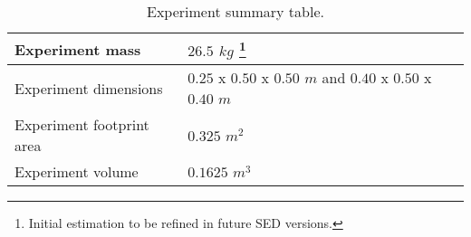 \begin{table}[!ht]
\centering
\begin{tabular}{|l|l|}
\hline
 Experiment mass  & $26.5$ $kg$ \footnote[13]{Initial estimation to be refined in future SED versions.} \\ \hline
 Experiment dimensions & $0.25$ x $0.50$ x $0.50$ $m$ and $0.40$ x $0.50$ x $0.40$ $m$ \\ \hline
 Experiment footprint area & $0.325$ $m^2$ \\ \hline
 Experiment volume  & $0.1625$ $m^3$ \\ \hline
\end{tabular}
\caption{Experiment summary table.}
\label{dimensions_mass}
\end{table}
\raggedbottom